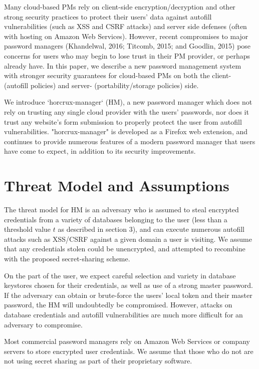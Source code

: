 \documentclass[conference]{IEEEtran}
\begin{document}
Many cloud-based PMs rely on client-side encryption/decryption and other strong
security practices to protect their users' data against autofill vulnerabilities
(such as XSS and CSRF attacks) and server side defenses (often with hosting on
Amazon Web Services). However, recent compromises to major password managers
(Khandelwal, 2016; Titcomb, 2015; and Goodlin, 2015) pose concerns for users who
may begin to lose trust in their PM provider, or perhaps already have. In this
paper, we describe a new password management system with stronger security
guarantees for cloud-based
PMs on both the client- (autofill policies) and server- (portability/storage
policies) side.

We introduce `horcrux-manager` (HM), a new password manager which
does not rely on trusting any single cloud provider with the users' passwords,
nor does it trust any website's form submission to properly protect the user
from autofill vulnerabilities. "horcrux-manager" is developed as a
Firefox web extension, and continues to provide numerous features of
a modern password manager that users have come to expect, in addition to its
security improvements.

\section{Threat Model and Assumptions}
The threat model for HM is an adversary who is assumed to steal encrypted
credentials from a variety of databases belonging to the user (less than a
threshold value $t$ as described in section 3), and can execute numerous
autofill attacks such as XSS/CSRF against a given domain a user is visiting. 
We assume that any credentials stolen could be unencrypted, and attempted to
recombine with the proposed secret-sharing scheme.

On the part of the user, we expect careful selection and variety in database
keystores chosen for their credentials, as well as use of a strong master password.
If the adversary can obtain or brute-force the users' local token and their
master password, the HM will undoubtedly be compromised. However, attacks on
database credentials and autofill vulnerabilities are much more difficult for an
adversary to compromise.

Most commercial password managers rely on Amazon Web Services or company servers 
to store encrypted user credentials. We assume that those who do not are not
using secret sharing as part of their proprietary software.
\end{document}
